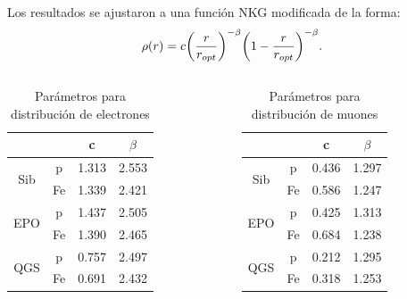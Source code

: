 \documentclass[11pt,table,compress]{beamer}
\begin{document}
	\begin{frame}
	Los resultados se ajustaron a una función NKG modificada de la forma:
		\begin{align*}
		\rho(r) = c \qty(\frac{r}{r_{opt}})^{-\beta}\qty(1-\frac{r}{r_{opt}})^{-\beta}.
		\end{align*}
		\begin{columns}
			\begin{column}{0.5\textwidth}
				\begin{table}
				\caption{Parámetros para distribución de electrones}
				\begin{tabular}{c|c|cc}
				\hline
						                     &  & c     & $\beta$ \\ \hline
				\multirow{2}{*}{Sib} & p        & 1.313 & 2.553   \\  
				                             & Fe       & 1.339 & 2.421   \\ \hline
				\multirow{2}{*}{EPO}    & p        & 1.437 & 2.505   \\  
				                             & Fe       & 1.390 & 2.465   \\ \hline
				\multirow{2}{*}{QGS} & p        & 0.757 & 2.497   \\ 
				                             & Fe       & 0.691 & 2.432   \\ \hline
				\end{tabular}
				\end{table}
			\end{column}
			\begin{column}{0.5\textwidth}
				\begin{table}
				\caption{Parámetros para distribución de muones}
				\begin{tabular}{c|c|cc}
				\hline
				                     		 &  & c     & $\beta$ \\ \hline
				\multirow{2}{*}{Sib} & p        & 0.436 & 1.297   \\ 
				                             & Fe       & 0.586 & 1.247   \\ \hline
				\multirow{2}{*}{EPO}    & p        & 0.425 & 1.313   \\  
				                             & Fe       & 0.684 & 1.238   \\ \hline
				\multirow{2}{*}{QGS} & p        & 0.212 & 1.295   \\  
				                             & Fe       & 0.318 & 1.253   \\ \hline
				\end{tabular}
				\end{table}
			\end{column}
		\end{columns}
	\end{frame}	
	
\end{document}
